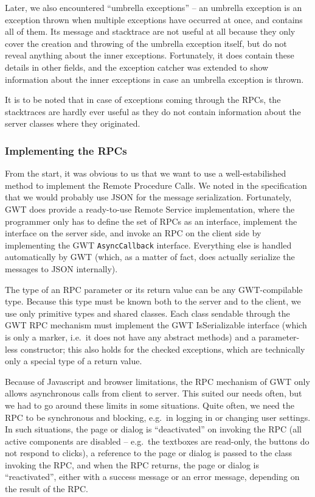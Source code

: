 Later, we also encountered ``umbrella exceptions'' -- an umbrella exception is an exception thrown when multiple exceptions have occurred at once, and contains all of them. Its message and stacktrace are not useful at all because they only cover the creation and throwing of the umbrella exception itself, but do not reveal anything about the inner exceptions. Fortunately, it does contain these details in other fields, and the exception catcher was extended to show information about the inner exceptions in case an umbrella exception is thrown.

It is to be noted that in case of exceptions coming through the RPCs, the stacktraces are hardly ever useful as they do not contain information about the server classes where they originated.

\subsubsection{Implementing the RPCs}

From the start, it was obvious to us that we want to use a well-estabilished method to implement the Remote Procedure Calls.
We noted in the specification that we would probably use JSON for the message serialization.
Fortunately, GWT does provide a ready-to-use Remote Service implementation, where the programmer only has to define the set of RPCs as an interface, implement the interface on the server side, and invoke an RPC on the client side by implementing the GWT {\tt AsyncCallback} interface.
Everything else is handled automatically by GWT (which, as a matter of fact, does actually serialize the messages to JSON internally).

The type of an RPC parameter or its return value can be any GWT-compilable type. Because this type must be known both to the server and to the client, we use only primitive types and shared classes. Each class sendable through the GWT RPC mechanism must implement the GWT IsSerializable interface (which is only a marker, i.e.\ it does not have any abstract methods) and a parameter-less constructor; this also holds for the checked exceptions, which are technically only a special type of a return value.

Because of Javascript and browser limitations, the RPC mechanism of GWT only allows asynchronous calls from client to server. This suited our needs often, but we had to go around these limits in some situations. Quite often, we need the RPC to be synchronous and blocking, e.g.\ in logging in or changing user settings. In such situations, the page or dialog is ``deactivated'' on invoking the RPC (all active components are disabled -- e.g.\ the textboxes are read-only, the buttons do not respond to clicks), a reference to the page or dialog is passed to the class invoking the RPC, and when the RPC returns, the page or dialog is ``reactivated'', either with a success message or an error message, depending on the result of the RPC.

